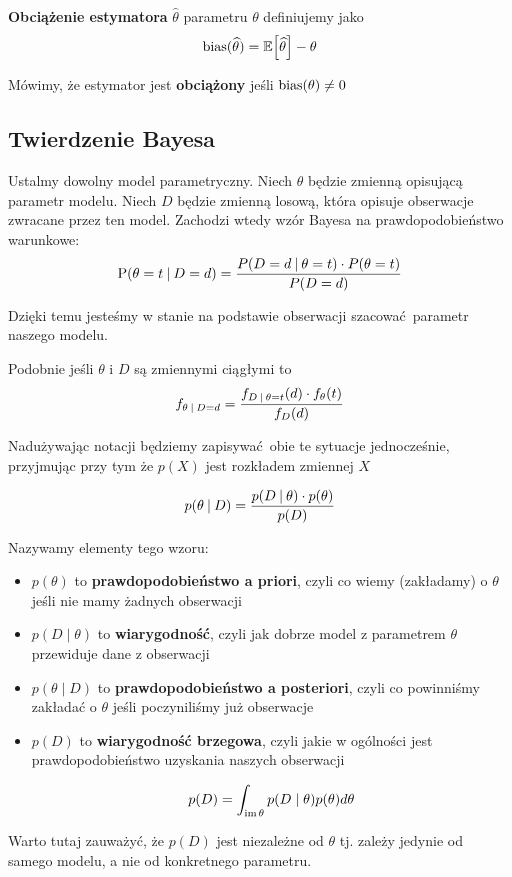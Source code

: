 \begin{definition}
\textbf{Obciążenie estymatora} \( \widehat \theta \) parametru \( \theta \) definiujemy jako
\[
    \bias(\widehat \theta) = \expected{\widehat \theta} - \theta
\]

Mówimy, że estymator jest \textbf{obciążony} jeśli \( \operatorname{bias}(\theta) \neq 0 \)
\end{definition}

\subsection{Twierdzenie Bayesa}

Ustalmy dowolny model parametryczny.
Niech \( \theta \) będzie zmienną opisującą parametr modelu.
Niech \( D \) będzie zmienną losową, która opisuje obserwacje zwracane przez ten model.
Zachodzi wtedy wzór Bayesa na prawdopodobieństwo warunkowe:
\[
    \operatorname{P}(\theta = t \:\vert\: D = d) = \frac{P(D = d \:\vert\: \theta = t) \cdot P(\theta =t )}{P(D = d)}
\]

Dzięki temu jesteśmy w stanie na podstawie obserwacji szacować parametr naszego modelu.

Podobnie jeśli \( \theta \) i \( D \) są zmiennymi ciągłymi to
\[
    f_{\theta \:\vert\: D = d} = \frac{f_{D \:\vert\: \theta = t}(d) \cdot f_\theta(t)}{f_D(d)}
\]

Nadużywając notacji będziemy zapisywać obie te sytuacje jednocześnie, przyjmując przy tym że \( p(X) \) jest rozkładem zmiennej \( X \)

\[
    p(\theta \:\vert\: D) = \frac{p(D \:\vert\: \theta) \cdot p(\theta)}{p(D)}
\]

Nazywamy elementy tego wzoru:
\begin{itemize}
    \item \( p(\theta) \) to \textbf{prawdopodobieństwo a priori}, czyli co wiemy (zakładamy) o \( \theta \) jeśli nie mamy żadnych obserwacji
    \item \( p(D \mid \theta) \) to \textbf{wiarygodność}, czyli jak dobrze model z parametrem \( \theta \) przewiduje dane z obserwacji
    \item \( p(\theta \mid D) \) to \textbf{prawdopodobieństwo a posteriori}, czyli co powinniśmy zakładać o \( \theta \) jeśli poczyniliśmy już obserwacje
    \item \( p(D) \) to \textbf{wiarygodność brzegowa}, czyli jakie w ogólności jest prawdopodobieństwo uzyskania naszych obserwacji
    
    \[
        p(D) = \int_{\operatorname{im} \theta} p(D \mid \theta)p(\theta)d\theta 
    \]
\end{itemize}

Warto tutaj zauważyć, że \( p(D) \) jest niezależne od \( \theta \) tj. zależy jedynie od samego modelu, a nie od konkretnego parametru.
